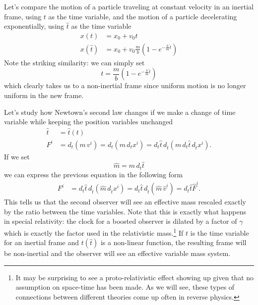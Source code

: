 Let's compare the motion of a particle traveling at constant velocity in an inertial frame, using $t$ as the time variable, and the motion of a particle decelerating exponentially, using $\hat{t}$ as the time variable
\begin{equation}
	\begin{aligned}
		x(t) &= x_0 + v_0 t \\
		x(\hat{t}) &= x_0 + v_0 \frac{m}{b}\left(1-e^{-\frac{b}{m}\hat{t}}\right)
	\end{aligned}
\end{equation}
Note the striking similarity: we can simply set
\begin{equation}
	t = \frac{m}{b} \left(1-e^{-\frac{b}{m}\hat{t}}\right)
\end{equation}
which clearly takes us to a non-inertial frame since uniform motion is no longer uniform in the new frame.

Let's study how Newtown's second law changes if we make a change of time variable while keeping the position variables unchanged
\begin{equation}
	\begin{aligned}
		\hat{t}&=\hat{t}(t) \\
		F^i &= d_t  (m \, v^i) = d_t  (m \, d_t x^i) = d_t \hat{t} \, d_{\hat{t}}  (m \, d_t \hat{t} \, d_{\hat{t}} x^i).
	\end{aligned}
\end{equation}
If we set
\begin{equation}
	\hat{m} = m \, d_t \hat{t}
\end{equation}
we can express the previous equation in the following form
\begin{equation}
	\begin{aligned}
		F^i &= d_t \hat{t} \, d_{\hat{t}}  (\hat{m} \, d_{\hat{t}} x^i) = d_t \hat{t} \, d_{\hat{t}}  (\hat{m} \, \hat{v}^i) = d_t \hat{t} \hat{F}^i.
	\end{aligned}
\end{equation}
This tells us that the second observer will see an effective mass rescaled exactly by the ratio between the time variables. Note that this is exactly what happens in special relativity: the clock for a boosted observer is dilated by a factor of $\gamma$ which is exactly the factor used in the relativistic mass.\footnote{It may be surprising to see a proto-relativistic effect showing up given that no assumption on space-time has been made. As we will see, these types of connections between different theories come up often in reverse physics.} If $t$ is the time variable for an inertial frame and $t(\hat{t})$ is a non-linear function, the resulting frame will be non-inertial and the observer will see an effective variable mass system.

